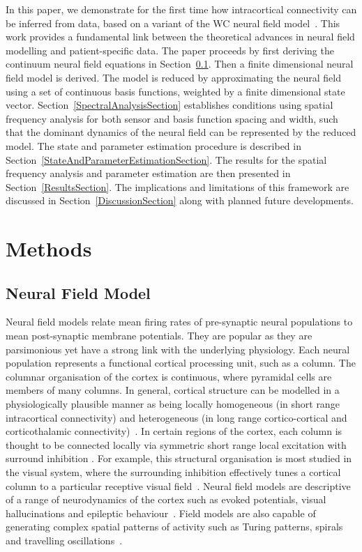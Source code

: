 \documentclass[10pt]{article}
\begin{document}
In this paper, we demonstrate for the first time how intracortical connectivity can be inferred from data, based on a variant of the WC neural field model~\cite{Wilson1973}. This work provides a fundamental link between the theoretical advances in neural field modelling and patient-specific data. The paper proceeds by first deriving the continuum neural field equations in Section~\ref{NeuralModelSection}. Then a finite dimensional neural field model is derived. The model is reduced by approximating the neural field using a set of continuous basis functions, weighted by a finite dimensional state vector. Section~\ref{SpectralAnalysisSection} establishes conditions using spatial frequency analysis for both sensor and basis function spacing and width, such that the dominant dynamics of the neural field can be represented by the reduced model. The state and parameter estimation procedure is described in Section~\ref{StateAndParameterEstimationSection}. The results for the spatial frequency analysis and parameter estimation are then presented in Section~\ref{ResultsSection}. The implications and limitations of this framework are discussed in Section~\ref{DiscussionSection} along with planned future developments.

\section*{Methods}

\subsection{Neural Field Model}\label{NeuralModelSection} 
Neural field models relate mean firing rates of pre-synaptic neural populations to mean post-synaptic membrane potentials. They are popular as they are parsimonious yet have a strong link with the underlying physiology. Each neural population represents a functional cortical processing unit, such as a column. The columnar organisation of the cortex is continuous, where pyramidal cells are members of many columns. In general, cortical structure can be modelled in a physiologically plausible manner as being locally homogeneous (in short range intracortical connectivity) and heterogeneous (in long range cortico-cortical and corticothalamic connectivity)~\cite{Jirsa2009,Qubbaj2007}. In certain regions of the cortex, each column is thought to be connected locally via symmetric short range local excitation with surround inhibition \cite{Braitenberg1998}. For example, this structural organisation is most studied in the visual system, where the surrounding inhibition effectively tunes a cortical column to a particular receptive visual field~\cite{Sullivan2006}. Neural field models are descriptive of a range of neurodynamics of the cortex such as evoked potentials, visual hallucinations and epileptic behaviour~\cite{David2003,Bressloff2001,Breakspear2006}. Field models are also capable of generating complex spatial patterns of activity such as Turing patterns, spirals and travelling oscillations~\cite{Amari1977,Coombes2005,Coombes2007}.
\end{document}
